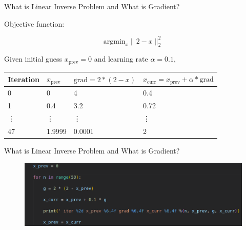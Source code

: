 \begin{frame}{What is Linear Inverse Problem and What is Gradient?}

	Objective function:

	\begin{equation}
		\mathrm{argmin}_x \lVert 2 - x \rVert_2^2
	\end{equation}

	\vfill

	Given initial guess $x_\mathrm{prev} = 0$ and learning rate $\alpha = 0.1$,

	\begin{table}
		\centering
		\begin{tabular}{p{} p{} p{} p{}}
			\toprule
			Iteration & $x_\mathrm{prev}$ & $\mathrm{grad} = 2 * (2 - x)$ & $x_\mathrm{curr} = x_\mathrm{prev} + \alpha * \mathrm{grad}$ \\
			\midrule
			0 & 0 & 4 & 0.4 \\
			1 & 0.4 & 3.2 & 0.72 \\
			\vdots & \vdots & \vdots & \vdots \\
			47 & 1.9999 & 0.0001 & 2 \\
			\bottomrule
		\end{tabular}
	\end{table}

\end{frame}


\begin{frame}{What is Linear Inverse Problem and What is Gradient?}

	\begin{figure}
		\includegraphics[width=\textwidth]{fig/gradient.png}
	\end{figure}

\end{frame}


